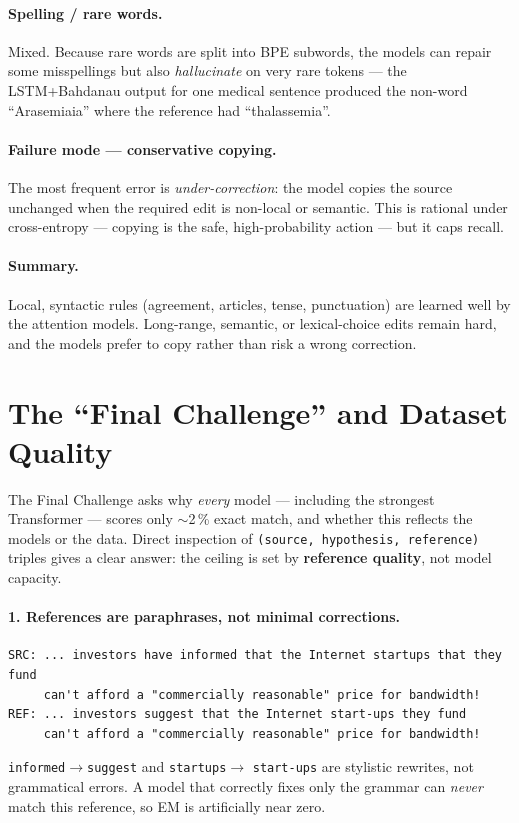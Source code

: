 \documentclass[11pt,a4paper]{article}
\begin{document}
\paragraph{Spelling / rare words.}
Mixed. Because rare words are split into BPE subwords, the models can repair
some misspellings but also \emph{hallucinate} on very rare tokens --- the
LSTM+Bahdanau output for one medical sentence produced the non-word
``Arasemiaia'' where the reference had ``thalassemia''.

\paragraph{Failure mode --- conservative copying.}
The most frequent error is \emph{under-correction}: the model copies the source
unchanged when the required edit is non-local or semantic. This is rational
under cross-entropy --- copying is the safe, high-probability action --- but it
caps recall.

\paragraph{Summary.} Local, syntactic rules (agreement, articles, tense,
punctuation) are learned well by the attention models. Long-range, semantic, or
lexical-choice edits remain hard, and the models prefer to copy rather than risk
a wrong correction.

\section{The ``Final Challenge'' and Dataset Quality}
\label{sec:challenge}
The Final Challenge asks why \emph{every} model --- including the strongest
Transformer --- scores only $\sim$2\,\% exact match, and whether this reflects
the models or the data. Direct inspection of \texttt{(source, hypothesis,
reference)} triples gives a clear answer: the ceiling is set by
\textbf{reference quality}, not model capacity.

\paragraph{1. References are paraphrases, not minimal corrections.}
\begin{lstlisting}
SRC: ... investors have informed that the Internet startups that they fund
     can't afford a "commercially reasonable" price for bandwidth!
REF: ... investors suggest that the Internet start-ups they fund
     can't afford a "commercially reasonable" price for bandwidth!
\end{lstlisting}
\texttt{informed}$\rightarrow$\texttt{suggest} and \texttt{startups}$\rightarrow$
\texttt{start-ups} are stylistic rewrites, not grammatical errors. A model that
correctly fixes only the grammar can \emph{never} match this reference, so EM is
artificially near zero.
\end{document}
